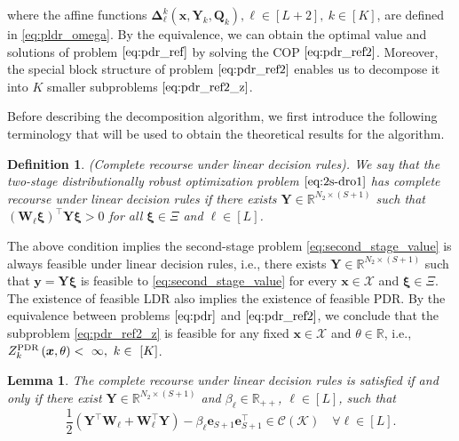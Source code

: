\documentclass{article}
\newcommand{\RR}{\mathbb{R}}
\newtheorem{lemma}{Lemma}
\newtheorem{defi}{Definition}
\begin{document}
where the affine functions $\bm \Delta^k_\ell(\bm x,\bm Y_k,\bm Q_k), \ell \in [L+2], \ k \in [K]$, are defined in \eqref{eq:pldr_omega}. By the equivalence, we can obtain the optimal value and solutions of problem $\eqref{eq:pdr_ref}$ by solving the COP $\eqref{eq:pdr_ref2}$. Moreover, the special block structure of problem $\eqref{eq:pdr_ref2}$ enables us to decompose it into $K$ smaller subproblems $\eqref{eq:pdr_ref2_z}$. %

Before describing the decomposition algorithm, we first introduce the following terminology that will be used to obtain %
the theoretical  results for the algorithm. %
\begin{defi} 
\textup{(Complete recourse under linear decision rules).} We say that the  two-stage distributionally robust optimization problem $\eqref{eq:2s-dro1}$ has complete recourse under linear decision rules if %
there exists $\bm Y \in \RR^{N_2 \times (S+1)}$ such that $(\bm W_\ell\bm \xi)^\top \bm Y \bm \xi > 0$ for all $\bm \xi \in \Xi$ and $\ell \in [L]$.
\end{defi}
The above condition implies the second-stage problem \eqref{eq:second_stage_value}  is always feasible under linear decision rules, i.e., there exists  $\bm Y \in \RR^{N_2 \times (S+1)}$ such that  $\bm y = \bm Y \bm \xi$ is feasible to  \eqref{eq:second_stage_value} for every $\bm x \in \mathcal{X}$ and $\bm \xi \in \Xi$. The existence of feasible LDR also implies the existence of feasible PDR. By the equivalence between problems $\eqref{eq:pdr}$ and $\eqref{eq:pdr_ref2}$, we conclude that the subproblem \eqref{eq:pdr_ref2_z} is feasible for any fixed $\bm x \in \mathcal{X}$ and $\theta \in \RR$, i.e., $Z^{\textup{PDR}}_k \left(\bm x, \theta \right)<~\infty, \ k \in~[K]$.

\begin{lemma}
The complete recourse under linear decision rules is satisfied if and only if there exist \linebreak $\bm Y \in \RR^{N_2 \times (S+1)}$ and $\beta_\ell \in \RR_{++}$, $\ell\in[L]$, such that 
\begin{equation}
\label{eq: complete_recourse_LDR}
    \frac{1}{2}\left (\bm Y^\top \bm W_\ell + \bm W_\ell^\top \bm Y \right ) - \beta_\ell \mathbf{e}_{S+1} \mathbf{e}_{S+1}^\top \in {\mathcal{C}(\mathcal{K})} \quad \forall  \ell \in [L].
\end{equation}
\end{lemma}
\end{document}
